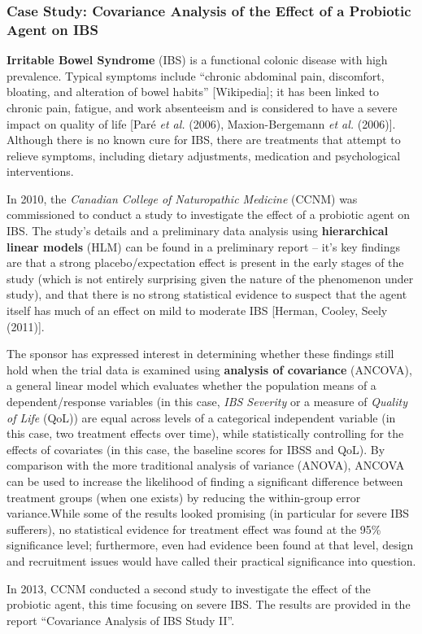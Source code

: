 \subsubsection{Case Study: Covariance Analysis of the Effect of a Probiotic Agent on IBS}\label{sec:CCNM}
\textbf{Irritable Bowel Syndrome} (IBS) is a functional colonic disease with high prevalence. Typical symptoms include ``chronic abdominal pain, discomfort, bloating, and alteration of bowel habits'' [Wikipedia]; it has been linked to chronic pain, fatigue, and work absenteeism and is considered to have a severe impact on quality of life [Par\'e \textit{et al.} (2006), Maxion-Bergemann \textit{et al.} (2006)]. Although there is no known cure for IBS, there are treatments that attempt to relieve symptoms, including dietary adjustments, medication and psychological interventions.
\par In 2010, the \textit{Canadian College of Naturopathic Medicine} (CCNM) was commissioned to conduct a study to investigate the effect of a probiotic agent on IBS. The study's details and a preliminary data analysis using \textbf{hierarchical linear models} (HLM) can be found in a preliminary report -- it's key findings are that a strong placebo/expectation effect is present in the early stages of the study (which is not entirely surprising given the nature of the phenomenon under study), and that there is no strong statistical evidence to suspect that the agent itself has much of an effect on mild to moderate IBS [Herman, Cooley, Seely (2011)].
\par The sponsor has expressed interest in determining whether these findings still hold when the trial data is examined using \textbf{analysis of covariance} (ANCOVA), a general linear model which evaluates whether the population means of a dependent/response variables (in this case, \textit{IBS Severity} or a measure of \textit{Quality of Life} (QoL)) are equal across levels of a categorical independent variable (in this case, two treatment effects over time), while statistically controlling for the effects of covariates (in this case, the baseline scores for IBSS and QoL). By comparison with the more traditional analysis of variance (ANOVA), ANCOVA can be used to increase the likelihood of finding a significant difference between treatment groups (when one exists) by reducing the within-group error variance.\newl While some of the results looked promising (in particular for severe IBS sufferers), no statistical evidence for treatment effect was found at the 95\% significance level; furthermore, even had evidence been found at that level, design and recruitment issues would have called their practical significance into question. \par In 2013, CCNM conducted a second study to investigate the effect of the probiotic agent, this time focusing on severe IBS. The results are provided in the report ``Covariance Analysis of IBS Study II''. 
